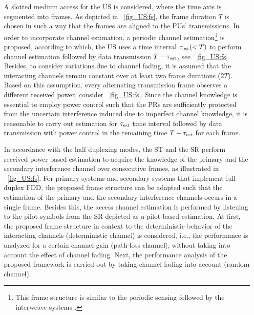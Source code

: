 A slotted medium access for the US is considered, where the time axis is segmented into frames. As depicted in \figurename~\ref{fig_US:fs}, the frame duration $T$ is chosen in such a way that the frames are aligned to the PUs' transmissions. In order to incorporate channel estimation, a periodic channel estimation\footnote{This frame structure is similar to the periodic sensing followed by the interweave systems \cite{Liang08}.} is proposed, according to which, the US uses a time interval $\tau_{\text{est}} (< T)$ to perform channel estimation followed by data transmission $T- \tau_{\text{est}}$, see \figurename~\ref{fig_US:fs}. Besides, to consider variations due to channel fading, it is assumed that the interacting channels remain constant over at least two frame durations ($2T$). Based on this assumption, every alternating transmission frame observes a different received power, consider \figurename~\ref{fig_US:fs}. Since the channel knowledge is essential to employ power control such that the PRs are sufficiently protected from the uncertain interference induced due to imperfect channel knowledge, it is reasonable to carry out estimation for $\tau_{\text{est}}$ time interval followed by data transmission with power control in the remaining time $T - \tau_{\text{est}}$ for each frame. %

In accordance with the half duplexing modes, the ST and the SR perform received power-based estimation to acquire the knowledge of the primary and the secondary interference channel over consecutive frames, as illustrated in \figurename~\ref{fig_US:fs}. For primary systems and secondary systems that implement full-duplex FDD, the proposed frame structure can be adapted such that the estimation of the primary and the secondary interference channels occurs in a single frame. Besides this, the access channel estimation is performed by listening to the pilot symbols from the SR depicted as a pilot-based estimation. 
At first, the proposed frame structure in context to the deterministic behavior of the interacting channels (deterministic channel) is considered, i.e., the performance is analyzed for a certain channel gain (path-loss channel), without taking into account the effect of channel fading. Next, the performance analysis of the proposed framework is carried out by taking channel fading into account (random channel). %



